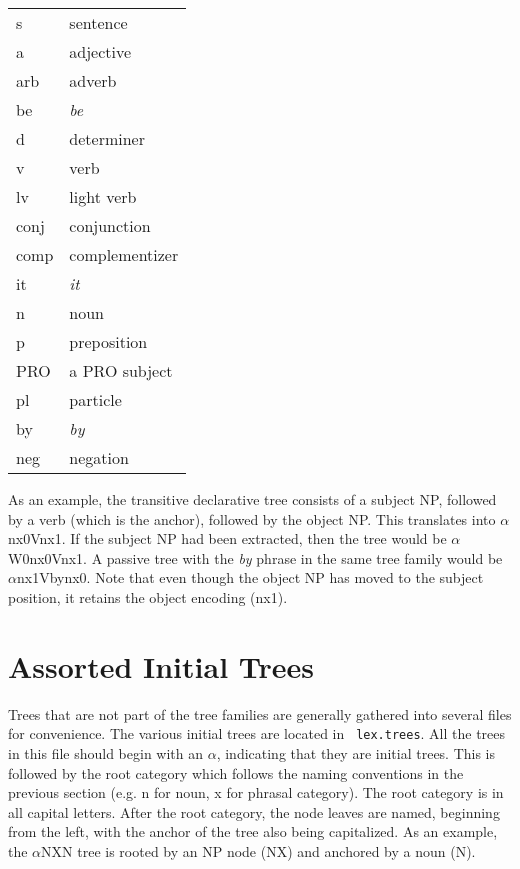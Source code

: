 \begin{description}
\item\begin{tabular}{ll}
s&sentence\\
a&adjective\\
arb&adverb\\
be&{\it be}\\
d&determiner\\
v&verb\\
lv&light verb\\
conj&conjunction\\
comp&complementizer\\
it&{\it it}\\
n&noun\\
p&preposition\\
PRO&a PRO subject \\
pl&particle\\
by&{\it by}\\
neg&negation\\
\end{tabular}
\end{description}

\noindent As an example, the transitive declarative tree consists of a subject
NP, followed by a verb (which is the anchor), followed by the object NP.  This
translates into $\alpha$nx0Vnx1.  If the subject NP had been extracted, then
the tree would be $\alpha$W0nx0Vnx1.  A passive tree with the {\it by} phrase
in the same tree family would be $\alpha$nx1Vbynx0.  Note that even though the
object NP has moved to the subject position, it retains the object encoding
(nx1). 

\section{Assorted Initial Trees}

Trees that are not part of the tree families are generally gathered into
several files for convenience.  The various initial trees are located in {\tt
lex.trees}.  All the trees in this file should begin with an $\alpha$,
indicating that they are initial trees.  This is followed by the root category
which follows the naming conventions in the previous section (e.g. n for noun,
x for phrasal category).  The root category is in all capital letters.  After
the root category, the node leaves are named, beginning from the left, with the
anchor of the tree also being capitalized.  As an example, the $\alpha$NXN
tree is rooted by an NP node (NX) and anchored by a noun (N).

